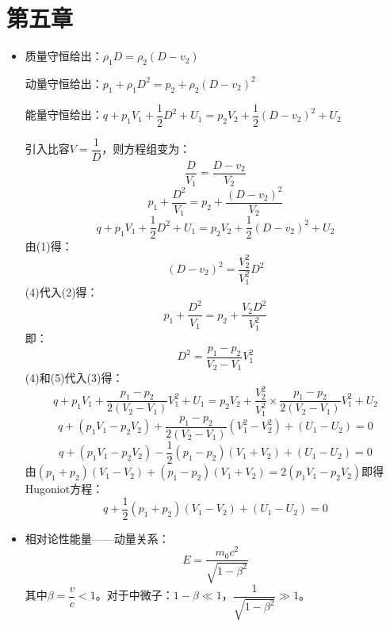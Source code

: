 \documentclass[a4paper,fontset=none]{ctexart}
\begin{document}
    \section*{第五章}

    \begin{itemize}

        \item[1.]
        \setcounter{equation}{0}
        质量守恒给出：$\rho_1 D = \rho_2(D-v_2)$

        动量守恒给出：$p_1 + \rho_1 D^2 = p_2 + \rho_2 (D-v_2)^2$

        能量守恒给出：$q + p_1 V_1 + \dfrac{1}{2}D^2 + U_1 = p_2 V_2 + \dfrac{1}{2}(D-v_2)^2 + U_2$

        引入比容$V = \dfrac{1}{D}$，则方程组变为：
        \begin{equation}
            \frac{D}{V_1} = \frac{D-v_2}{V_2}
        \end{equation}
        \begin{equation}
            p_1 + \frac{D^2}{V_1} = p_2 + \frac{(D-v_2)^2}{V_2}
        \end{equation}
        \begin{equation}
            q + p_1 V_1 + \frac{1}{2}D^2 + U_1 = p_2 V_2 + \frac{1}{2}(D-v_2)^2 + U_2
        \end{equation}
        由(1)得：
        \begin{equation}
            (D-v_2)^2 = \frac{V_2^2}{V_1^2}D^2
        \end{equation}
        (4)代入(2)得：
        \[
        p_1 + \frac{D^2}{V_1} = p_2 + \frac{V_2 D^2}{V_1^2}
        \]
        即：
        \begin{equation}
            D^2 = \frac{p_1-p_2}{V_2-V_1}V_1^2
        \end{equation}
        (4)和(5)代入(3)得：
        \[
        q + p_1 V_1 + \frac{p_1-p_2}{2(V_2-V_1)}V_1^2 + U_1
        = p_2 V_2 + \frac{V_2^2}{V_1^2}\times\frac{p_1-p_2}{2(V_2-V_1)}V_1^2 + U_2
        \]
        \[
        q + (p_1 V_1 - p_2 V_2) + \frac{p_1-p_2}{2(V_2-V_1)}(V_1^2 - V_2^2) + (U_1 - U_2) = 0
        \]
        \[
        q + (p_1 V_1 - p_2 V_2) - \frac{1}{2}(p_1-p_2)(V_1+V_2) + (U_1 - U_2) = 0
        \]
        由$(p_1+p_2)(V_1-V_2) + (p_1-p_2)(V_1+V_2) = 2(p_1 V_1 - p_2 V_2)$即得Hugoniot方程：
        \[
        q + \frac{1}{2}(p_1+p_2)(V_1-V_2) + (U_1 - U_2) = 0
        \]

        \item[3.]
        \setcounter{equation}{0}
        相对论性能量——动量关系：
        \[
        E = \frac{m_0 c^2}{\sqrt{1-\beta^2}}
        \]
        其中$\beta = \dfrac{v}{c} < 1$。对于中微子：$1 - \beta \ll 1$，$\dfrac{1}{\sqrt{1-\beta^2}} \gg 1$。


\end{itemize}
\end{document}
